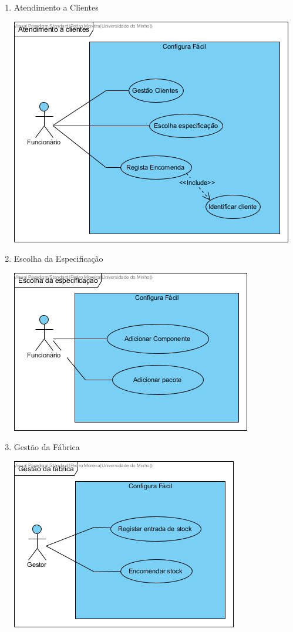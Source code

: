 \documentclass[11pt]{article} %
\begin{document}
\begin{enumerate}
\begin{center}
		\end{center}
	\item Atendimento a Clientes
		\begin{center}
 			\includegraphics[]{Atendimento_a_clientes.png}
		\end{center}\newpage
	\item Escolha da Especificação
		\begin{center}
 			\includegraphics[]{Escolha_da_especificacao.png}
		\end{center}
	\item Gestão da Fábrica
		\begin{center}
 			\includegraphics[]{Gestao_da_fabrica.png}
		\end{center}
\end{enumerate}
\end{document}
